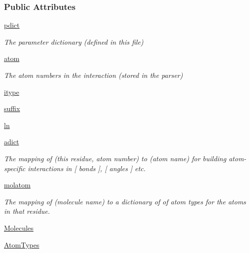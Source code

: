 \subsubsection*{Public Attributes}
\begin{DoxyCompactItemize}
\item 
\hyperlink{classforcebalance_1_1mol2io_1_1Mol2__Reader_a3d0014f83cdf754983feade05fa162e2}{pdict}
\begin{DoxyCompactList}\small\item\em The parameter dictionary (defined in this file) \end{DoxyCompactList}\item 
\hyperlink{classforcebalance_1_1mol2io_1_1Mol2__Reader_ab65a3dde9c3f2ba716089a52de4bf9fe}{atom}
\begin{DoxyCompactList}\small\item\em The atom numbers in the interaction (stored in the parser) \end{DoxyCompactList}\item 
\hyperlink{classforcebalance_1_1mol2io_1_1Mol2__Reader_a86efd5020943bd5cb52a9299e88a4fac}{itype}
\item 
\hyperlink{classforcebalance_1_1mol2io_1_1Mol2__Reader_a3c5f0f93848a5d83a50facb1d01fe3b1}{suffix}
\item 
\hyperlink{classforcebalance_1_1BaseReader_a80c8e3bea212600742968aa8669e557b}{ln}
\item 
\hyperlink{classforcebalance_1_1BaseReader_a2c46ad6b66cf09a30e917ce4a1997e2a}{adict}
\begin{DoxyCompactList}\small\item\em The mapping of (this residue, atom number) to (atom name) for building atom-\/specific interactions in \mbox{[} bonds \mbox{]}, \mbox{[} angles \mbox{]} etc. \end{DoxyCompactList}\item 
\hyperlink{classforcebalance_1_1BaseReader_ab444c213e15929253dd73395ac5f19fc}{molatom}
\begin{DoxyCompactList}\small\item\em The mapping of (molecule name) to a dictionary of of atom types for the atoms in that residue. \end{DoxyCompactList}\item 
\hyperlink{classforcebalance_1_1BaseReader_a4369b5fb663a83b11602daa71db6862e}{Molecules}
\item 
\hyperlink{classforcebalance_1_1BaseReader_a69ca7d949a4a3df4d9f61e617fe0e270}{Atom\-Types}
\end{DoxyCompactItemize}


